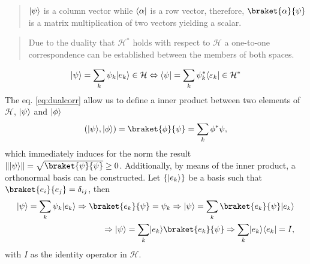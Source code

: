 \documentclass{article}
\begin{document}
\begin{quote}
  $\lvert\psi\rangle$ is a column vector while $\langle\alpha\rvert$ is a row vector, therefore, $\braket{\alpha}{\psi}$ is a matrix multiplication of two vectors yielding a scalar.
\end{quote}
\begin{quotation}
  Due to the duality that $\mathcal{H}^*$ holds with respect to $\mathcal{H}$ a one-to-one correspondence can be established between the members of both spaces.
\end{quotation}
\begin{align}\label{eq:dualcorr}
  \lvert\psi\rangle = \sum_k \psi_k\lvert e_k\rangle\in \mathcal{H} \Leftrightarrow \langle\psi\rvert = \sum_k \psi_k ^*\langle\varepsilon_k\rvert\in \mathcal{H}^*
\end{align}
The eq. \ref{eq:dualcorr} allow us to define a inner product between two elements of $\mathcal{H}$, $\lvert\psi\rangle$ and $\lvert\phi\rangle$
\begin{align}
  (\ket{\psi},\ket{\phi}) = \braket{\phi}{\psi}=\sum_k \phi^*\psi,
\end{align}
which immediately induces for the norm the result $\| \ket{\psi}\| = \sqrt{\braket{\psi}{\psi}}\geq 0$. Additionally, by means of the inner product, a orthonormal basis can be constructed.
Let $\{\lvert e_k\rangle\}$ be a basis such that $\braket{e_i}{e_j}=\delta_{ij}$, then
\begin{align}
  \ket{\psi} = \sum_k \psi_k \ket{e_k} \Rightarrow \braket{e_k}{\psi}=\psi_k \Rightarrow \ket{\psi} = \sum_k \braket{e_k}{\psi} \ket{e_k}\\
  \Rightarrow \ket{\psi} = \sum_k \ket{e_k}\braket{e_k}{\psi} \Rightarrow \sum_k \ket{e_k}\bra{e_k} = I,
\end{align}
with $I$ as the identity operator in $\mathcal{H}$.
\end{document}
